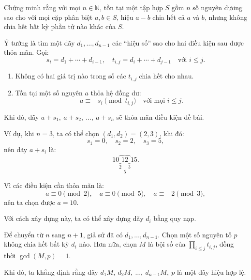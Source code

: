 \ifshowproblemandsoln
\ifshowproblem\begin{problem}\label{problem:USA-2015-TST-P2}\fi
\ifshowsoln\begin{problem}\fi
    Chứng minh rằng với mọi \( n \in \mathbb{N} \), tồn tại một tập hợp \( S \) gồm \( n \) số nguyên dương
    sao cho với mọi cặp phân biệt \( a, b \in S \), hiệu \( a - b \) chia hết cả \( a \) và \( b \),
    nhưng không chia hết bất kỳ phần tử nào khác của \( S \).
\end{problem}
\fi

\ifshowsoln
\begin{soln}\footnotemark
    Ý tưởng là tìm một dãy \( d_1, \ldots, d_{n-1} \) các “hiệu số” sao cho hai điều kiện sau được thỏa mãn. Gọi:
    \[
        s_i = d_1 + \cdots + d_{i-1}, \quad t_{i,j} = d_i + \cdots + d_{j-1} \quad \text{với } i \le j.
    \]

    \begin{enumerate}[topsep=0pt, partopsep=0pt, itemsep=0pt, label=(\roman*)]
        \item Không có hai giá trị nào trong số các \( t_{i,j} \) chia hết cho nhau.
        \item Tồn tại một số nguyên \( a \) thỏa hệ đồng dư:
        \[
            a \equiv -s_i \pmod{t_{i,j}} \quad \text{với mọi } i \le j.
        \]
    \end{enumerate}

    Khi đó, dãy \( a + s_1,\ a + s_2,\ \ldots,\ a + s_n \) sẽ thỏa mãn điều kiện đề bài.

    Ví dụ, khi \( n = 3 \), ta có thể chọn \( (d_1, d_2) = (2, 3) \), khi đó:
    \[
        s_1 = 0,\quad s_2 = 2,\quad s_3 = 5,
    \]
    nên dãy \( a + s_i \) là:
    \[
        10\overbrace{\underbrace{\ }_{2}12\underbrace{\ }_{3}}_{5}15.
    \]

    Vì các điều kiện cần thỏa mãn là:
    \[
        a \equiv 0 \pmod{2},\quad
        a \equiv 0 \pmod{5},\quad
        a \equiv -2 \pmod{3},
    \]
    nên ta chọn được \( a = 10 \).

    Với cách xây dựng này, ta có thể xây dựng dãy \( d_i \) bằng quy nạp.

    Để chuyển từ \( n \) sang \( n + 1 \), giả sử đã có \( d_1, \ldots, d_{n-1} \).
    Chọn một số nguyên tố \( p \) không chia hết bất kỳ \( d_i \) nào. 
    Hơn nữa, chọn \( M \) là bội số của \( \prod_{i \le j} t_{i,j} \), đồng thời \( \gcd(M, p) = 1 \).

    Khi đó, ta khẳng định rằng dãy \( d_1M,\ d_2M,\ \ldots,\ d_{n-1}M,\ p \) là một dãy hiệu hợp lệ.


\end{soln}
\end{problem}
